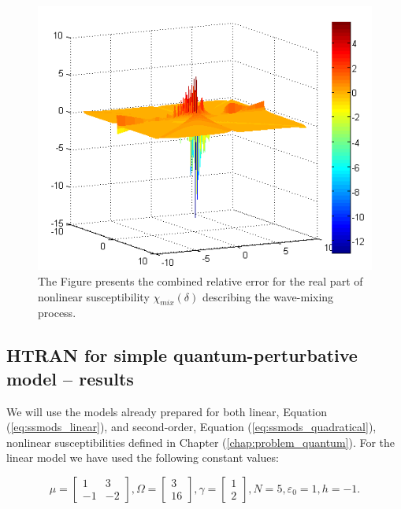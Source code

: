 \documentclass[12pt,twoside,a4paper]{article}
\numberwithin{equation}{subsection}
\numberwithin{figure}{subsection}
\begin{document}
\begin{figure}
  \begin{center}
    \includegraphics{img/htran_fmix_3derr.png}
    \caption{The Figure presents the combined relative error for the real part of nonlinear susceptibility ${\chi_{mix}}(\delta )$ describing the wave-mixing process. \label{fig:htran_fmix_3derr}}
  \end{center}    
\end{figure}

\subsection{HTRAN for simple quantum-perturbative model -- results} \label{chap:htran_quantum}

We will use the models already prepared for both linear, Equation (\ref{eq:ssmods_linear}), and second-order, Equation (\ref{eq:ssmods_quadratical}), nonlinear susceptibilities defined in Chapter (\ref{chap:problem_quantum}). For the linear model we have used the following constant values:

\begin{equation} \label{eq:htran_qp1_const}
  \mu = \begin{bmatrix} 
          1  & 3 \\ 
          -1 & -2
        \end{bmatrix},
  \Omega = \begin{bmatrix}
           3 \\ 16
           \end{bmatrix},
  \gamma = \begin{bmatrix}
           1 \\ 2
           \end{bmatrix}, 
  N = 5, 
  \varepsilon_0 = 1, 
  h = -1.
\end{equation}
\end{document}
